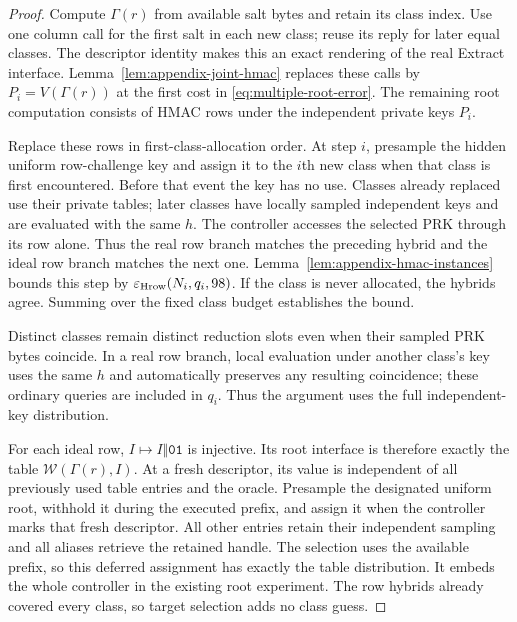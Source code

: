 \begin{proof}
Compute $\Gamma(r)$ from available salt bytes and retain its class index.
Use one column call for the first salt in each new class; reuse its reply for
later equal classes. The descriptor identity makes this an exact rendering
of the real Extract interface. Lemma~\ref{lem:appendix-joint-hmac} replaces
these calls by $P_i=V(\Gamma(r))$ at the first cost in
\eqref{eq:multiple-root-error}. The remaining root computation consists of
HMAC rows under the independent private keys $P_i$.

Replace these rows in first-class-allocation order. At step $i$, presample
the hidden uniform row-challenge key and assign it to the $i$th new class
when that class is first encountered. Before that event the key has no use.
Classes already replaced use their private tables; later classes have locally
sampled independent keys and are evaluated with the same $h$. The controller
accesses the selected PRK through its row alone. Thus the real row branch
matches the preceding hybrid and the ideal row branch matches the next one.
Lemma~\ref{lem:appendix-hmac-instances} bounds this step by
$\varepsilon_{\rm Hrow}(N_i,q_i,98)$. If the class is never allocated, the
hybrids agree. Summing over the fixed class budget establishes the bound.

Distinct classes remain distinct reduction slots even when their sampled
PRK bytes coincide. In a real row branch, local evaluation under another
class's key uses the same $h$ and automatically preserves any resulting
coincidence; these ordinary queries are included in $q_i$. Thus the argument
uses the full independent-key distribution.

For each ideal row, $I\mapsto I\Vert\mathtt{01}$ is injective. Its root
interface is therefore exactly the table $\mathcal W(\Gamma(r),I)$.
At a fresh descriptor, its value is independent of all previously used table
entries and the oracle. Presample the designated uniform root, withhold it
during the executed prefix, and assign it when the controller marks that
fresh descriptor. All other entries retain their independent sampling and
all aliases retrieve the retained handle. The selection uses the available
prefix, so this deferred assignment has exactly the table distribution.
It embeds the whole controller in the existing root experiment. The row
hybrids already covered every class, so target selection adds no class guess.
\end{proof}

